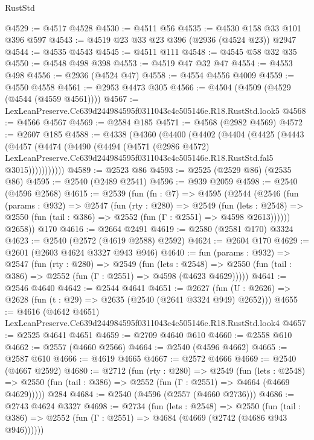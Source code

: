 \begin{lexlean}{RustStd}
\begin{coremodule}
@4529 := @4517 @4528
@4530 := @4511 @56
@4535 := @4530 @158 @33 @101 @396 @597
@4543 := @4519 @23 @33 @23 @396 (@2936 (@4524 @23)) @2947
@4544 := @4535 @4543
@4545 := @4511 @111
@4548 := @4545 @58 @32 @35
@4550 := @4548 @498 @398
@4553 := @4519 @47 @32 @47
@4554 := @4553 @498
@4556 := @2936 (@4524 @47)
@4558 := @4554 @4556 @4009
@4559 := @4550 @4558
@4561 := @2953 @4473 @305
@4566 := @4504 (@4509 (@4529 (@4544 (@4559 @4561))))
@4567 := LexLeanPreserve.Cc639d244984595f0311043c4c505146e.R18.RustStd.look5
@4568 := @4566 @4567
@4569 := @2584 @185
@4571 := @4568 (@2982 @4569)
@4572 := @2607 @185
@4588 := @4338
    (@4360
      (@4400
        (@4402
          (@4404
            (@4425
              (@4443
                (@4457
                  (@4474
                    (@4490
                      (@4494
                        (@4571
                          (@2986 @4572)
                          LexLeanPreserve.Cc639d244984595f0311043c4c505146e.R18.RustStd.fal5
                          @3015)))))))))))
@4589 := @2523 @86
@4593 := @2525 (@2529 @86) (@2535 @86)
@4595 := @2540 (@2489 @2541)
@4596 := @939 @2059
@4598 := @2540 (@4596 @2568)
@4615 := @2539
    (fun (fn : @7) =>
    @4595
      (@2544
        (@2546
          (fun (params : @932) =>
          @2547
            (fun (rty : @280) =>
            @2549
              (fun (lets : @2548) =>
              @2550 (fun (tail : @386) => @2552 (fun (Γ : @2551) => @4598 @2613))))))
        @2658))
    @170
@4616 := @2664 @2491
@4619 := @2580 (@2581 @170) @3324
@4623 := @2540 (@2572 (@4619 @2588) @2592)
@4624 := @2604 @170
@4629 := @2601 (@2603 @4624 @3327 @943 @946)
@4640 := fun (params : @932) =>
  @2547
    (fun (rty : @280) =>
    @2549
      (fun (lets : @2548) =>
      @2550 (fun (tail : @386) => @2552 (fun (Γ : @2551) => @4598 (@4623 @4629)))))
@4641 := @2546 @4640
@4642 := @2544 @4641
@4651 := @2627 (fun (U : @2626) => @2628 (fun (t : @29) => @2635 (@2540 (@2641 @3324 @949) @2652)))
@4655 := @4616 (@4642 @4651) LexLeanPreserve.Cc639d244984595f0311043c4c505146e.R18.RustStd.look4
@4657 := @2525 @4641 @4651
@4659 := @2709 @4640 @610
@4660 := @2558 @610
@4662 := @2557 (@4660 @2566)
@4664 := @2540 (@4596 @4662)
@4665 := @2587 @610
@4666 := @4619 @4665
@4667 := @2572 @4666
@4669 := @2540 (@4667 @2592)
@4680 := @2712
    (fun (rty : @280) =>
    @2549
      (fun (lets : @2548) =>
      @2550 (fun (tail : @386) => @2552 (fun (Γ : @2551) => @4664 (@4669 @4629)))))
    @284
@4684 := @2540 (@4596 (@2557 (@4660 @2736)))
@4686 := @2743 @4624 @3327
@4698 := @2734
    (fun (lets : @2548) =>
    @2550 (fun (tail : @386) => @2552 (fun (Γ : @2551) => @4684 (@4669 (@2742 (@4686 @943 @946))))))

\end{coremodule}
\end{lexlean}
